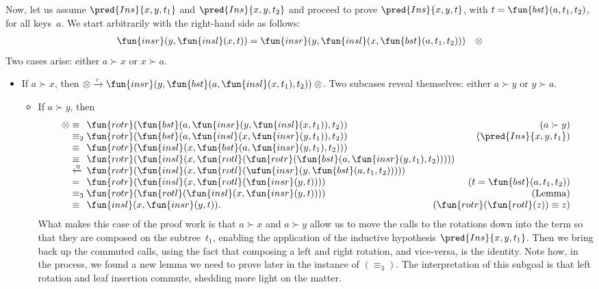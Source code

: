 Now, let us assume \(\pred{Ins}{x,y,t_1}\) and \(\pred{Ins}{x,y,t_2}\)
and proceed to prove \(\pred{Ins}{x,y,t}\), with
\(t=\fun{bst}(a,t_1,t_2)\), for all keys~\(a\). We start arbitrarily
with the right\hyp{}hand side as follows:
\begin{equation*}
\begin{array}{@{}r@{\;}l@{\;}l@{\quad}r@{}}
  \fun{insr}(y,\fun{insl}(x,t))
& = & \fun{insr}(y,\fun{insl}(x,\fun{bst}(a,t_1,t_2))) & \otimes
\end{array}
\end{equation*}
Two cases arise: either \(a \succ x\) or \(x \succ a\).
\begin{itemize}

\item If \(a \succ x\), then \(\otimes \xrightarrow{\smash{\tau}}
  \fun{insr}(y,\fun{bst}(a,\fun{insl}(x,t_1),t_2)) \; \otimes\). Two
  subcases reveal themselves: either \(a \succ y\) or \(y \succ a\).
  \begin{itemize}

    \item If \(a \succ y\), then
      \begin{equation*}
      \begin{array}{@{}r@{\;}l@{\;}l@{\hspace{-8mm}}r@{}}
        \otimes & \equiv &
        \fun{rotr}(\fun{bst}(a,\fun{insr}(y,\fun{insl}(x,t_1)),t_2))
        & (a \succ y)\\
        & \equiv_2 & \fun{rotr}(\fun{bst}(a,\fun{insl}(x,
        \fun{insr}(y,t_1)),t_2)) & (\pred{Ins}{x,y,t_1})\\
        & \equiv & \fun{rotr}(\fun{insl}(x,
        \fun{bst}(a,\fun{insr}(y,t_1),t_2)))\\
        & \equiv & \fun{rotr}(\fun{insl}(x,
        \fun{rotl}(\fun{rotr}(\fun{bst}(a,\fun{insr}(y,t_1),t_2)))))\\
        & \xleftarrow{\smash{\eta}} &
        \fun{rotr}(\fun{insl}(x,\fun{rotl}(\ufun{insr}(y,
        \fun{bst}(a,t_1,t_2)))))\\
        & = & \fun{rotr}(\fun{insl}(x,\fun{rotl}(\fun{insr}(y,t))))
        & (t=\fun{bst}(a,t_1,t_2))\\
        & \equiv_3 & \fun{rotr}(\fun{rotl}(\fun{insl}(x,
        \fun{insr}(y,t)))) & (\text{Lemma})\\
        & \equiv & \fun{insl}(x,\fun{insr}(y,t)).
        & (\fun{rotr}(\fun{rotl}(z)) \equiv z)
      \end{array}
      \end{equation*}
      What makes this case of the proof work is that \(a \succ x\) and
      \(a \succ y\) allow us to move the calls to the rotations down
      into the term so that they are composed on the subtree~\(t_1\),
      enabling the application of the inductive hypothesis
      \(\pred{Ins}{x,y,t_1}\). Then we bring back up the commuted
      calls, using the fact that composing a left and right rotation,
      and vice\hyp{}versa, is the identity. Note how, in the process,
      we found a new lemma we need to prove later in the instance of
      \((\equiv_3)\). The interpretation of this subgoal is that left
      rotation and leaf insertion commute, shedding more light on the
      matter.


\end{itemize}
\end{itemize}

